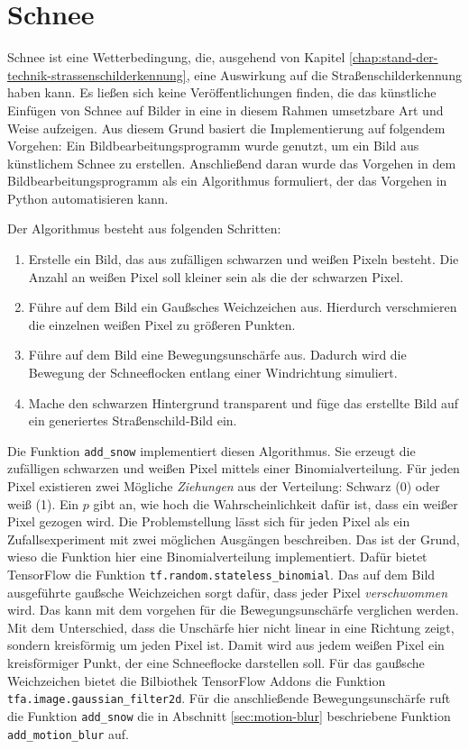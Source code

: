 \section{Schnee}

Schnee ist eine Wetterbedingung, die, ausgehend von Kapitel \ref{chap:stand-der-technik-strassenschilderkennung}, eine Auswirkung auf die Straßenschilderkennung haben kann. Es ließen sich keine Veröffentlichungen finden, die das künstliche Einfügen von Schnee auf Bilder in eine in diesem Rahmen umsetzbare Art und Weise aufzeigen. Aus diesem Grund basiert die Implementierung auf folgendem Vorgehen: Ein Bildbearbeitungsprogramm wurde genutzt, um ein Bild aus künstlichem Schnee zu erstellen. Anschließend daran wurde das Vorgehen in dem Bildbearbeitungsprogramm als ein Algorithmus formuliert, der das Vorgehen in Python automatisieren kann.

Der Algorithmus besteht aus folgenden Schritten:
\begin{enumerate}
  \item Erstelle ein Bild, das aus zufälligen schwarzen und weißen Pixeln besteht. Die Anzahl an weißen Pixel soll kleiner sein als die der schwarzen Pixel.
  \item Führe auf dem Bild ein Gaußsches Weichzeichen aus. Hierdurch verschmieren die einzelnen weißen Pixel zu größeren Punkten.
  \item Führe auf dem Bild eine Bewegungsunschärfe aus. Dadurch wird die Bewegung der Schneeflocken entlang einer Windrichtung simuliert.
  \item Mache den schwarzen Hintergrund transparent und füge das erstellte Bild auf ein generiertes Straßenschild-Bild ein.
\end{enumerate}

Die Funktion \texttt{add_snow} implementiert diesen Algorithmus. Sie erzeugt die zufälligen schwarzen und weißen Pixel mittels einer Binomialverteilung. Für jeden Pixel existieren zwei Mögliche \emph{Ziehungen} aus der Verteilung: Schwarz (0) oder weiß (1). Ein $p$ gibt an, wie hoch die Wahrscheinlichkeit dafür ist, dass ein weißer Pixel gezogen wird. Die Problemstellung lässt sich für jeden Pixel als ein Zufallsexperiment mit zwei möglichen Ausgängen beschreiben. Das ist der Grund, wieso die Funktion hier eine Binomialverteilung implementiert. Dafür bietet TensorFlow die Funktion \texttt{tf.random.stateless_binomial}. Das auf dem Bild ausgeführte gaußsche Weichzeichen sorgt dafür, dass jeder Pixel \emph{verschwommen} wird. Das kann mit dem vorgehen für die Bewegungsunschärfe verglichen werden. Mit dem Unterschied, dass die Unschärfe hier nicht linear in eine Richtung zeigt, sondern kreisförmig um jeden Pixel ist. Damit wird aus jedem weißen Pixel ein kreisförmiger Punkt, der eine Schneeflocke darstellen soll. Für das gaußsche Weichzeichen bietet die Bilbiothek TensorFlow Addons die Funktion \texttt{tfa.image.gaussian_filter2d}. Für die anschließende Bewegungsunschärfe ruft die Funktion \texttt{add_snow} die in Abschnitt \ref{sec:motion-blur} beschriebene Funktion \texttt{add_motion_blur} auf. \cite{geometric-ops}

